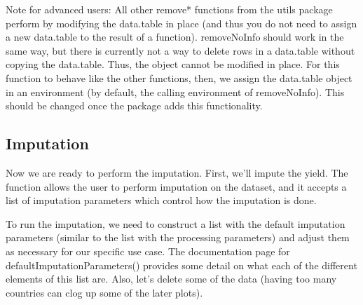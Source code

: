 \documentclass[nojss]{jss}\usepackage[]{graphicx}\usepackage[]{color}
\begin{document}
Note for advanced users: All other remove* functions from the utils package
perform by modifying the data.table in place (and thus you do not need to
assign a new data.table to the result of a function).  removeNoInfo should work
in the same way, but there is currently not a way to delete rows in a
data.table without copying the data.table.  Thus, the object cannot be modified
in place.  For this function to behave like the other functions, then, we
assign the data.table object in an environment (by default, the calling
environment of removeNoInfo).  This should be changed once the 
package adds this functionality.


\subsection{Imputation}

Now we are ready to perform the imputation.  First, we'll impute the yield.
The function 
allows the user to perform imputation on the dataset, and it accepts
a list of imputation parameters which control how the imputation is done.

To run the imputation, we need to construct a list with the default imputation
parameters (similar to the list with the processing parameters) and adjust
them as necessary for our specific use case.  The
documentation page for defaultImputationParameters() provides some detail on
what each of the different elements of this list are.  Also, let's delete some
of the data (having too many countries can clog up some of the later plots).
\end{document}
